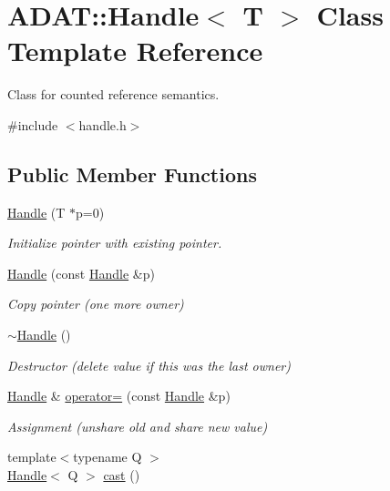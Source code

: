 \hypertarget{classADAT_1_1Handle}{}\section{A\+D\+AT\+:\+:Handle$<$ T $>$ Class Template Reference}
\label{classADAT_1_1Handle}


Class for counted reference semantics.  




{\ttfamily \#include $<$handle.\+h$>$}

\subsection*{Public Member Functions}
\begin{DoxyCompactItemize}
\item 
\mbox{\hyperlink{classADAT_1_1Handle_a510e41b73c3f685f4eb78a91020782c0}{Handle}} (T $\ast$p=0)
\begin{DoxyCompactList}\small\item\em Initialize pointer with existing pointer. \end{DoxyCompactList}\item 
\mbox{\hyperlink{classADAT_1_1Handle_af9529874ca6ca9db10dbbeeb0a776d84}{Handle}} (const \mbox{\hyperlink{classADAT_1_1Handle}{Handle}} \&p)
\begin{DoxyCompactList}\small\item\em Copy pointer (one more owner) \end{DoxyCompactList}\item 
\mbox{\hyperlink{classADAT_1_1Handle_a358ca2d3df9674e7ccb416574df96ce5}{$\sim$\+Handle}} ()
\begin{DoxyCompactList}\small\item\em Destructor (delete value if this was the last owner) \end{DoxyCompactList}\item 
\mbox{\hyperlink{classADAT_1_1Handle}{Handle}} \& \mbox{\hyperlink{classADAT_1_1Handle_a2d5773885c448de401319f9523742954}{operator=}} (const \mbox{\hyperlink{classADAT_1_1Handle}{Handle}} \&p)
\begin{DoxyCompactList}\small\item\em Assignment (unshare old and share new value) \end{DoxyCompactList}\item 
{\footnotesize template$<$typename Q $>$ }\\\mbox{\hyperlink{classADAT_1_1Handle}{Handle}}$<$ Q $>$ \mbox{\hyperlink{classADAT_1_1Handle_aac9634a0530419244ef076e63ff2b984}{cast}} ()

\end{DoxyCompactItemize}
